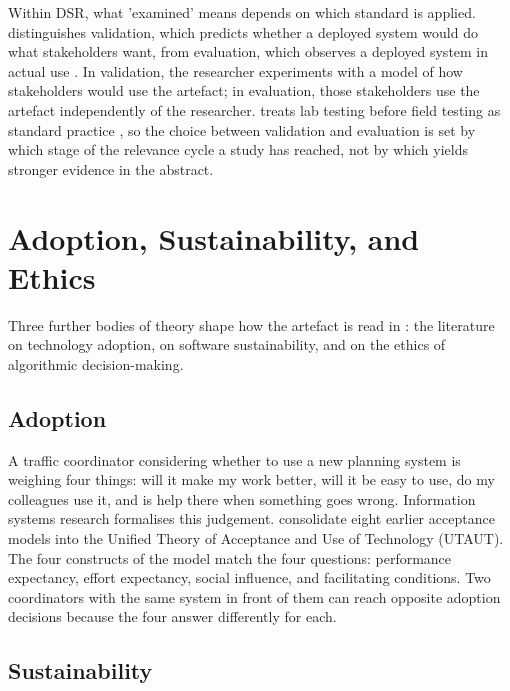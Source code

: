 Within DSR, what 'examined' means depends on which standard is applied. \textcite{wieringa2014dsm} distinguishes validation, which predicts whether a deployed system would do what stakeholders want, from evaluation, which observes a deployed system in actual use \parencite[pp.~31, 34]{wieringa2014dsm}. In validation, the researcher experiments with a model of how stakeholders would use the artefact; in evaluation, those stakeholders use the artefact independently of the researcher. \textcite{hevner2007threecycle} treats lab testing before field testing as standard practice \parencite[p.~91]{hevner2007threecycle}, so the choice between validation and evaluation is set by which stage of the relevance cycle a study has reached, not by which yields stronger evidence in the abstract.


\section{Adoption, Sustainability, and Ethics}
\label{sec:adjacent}

Three further bodies of theory shape how the artefact is read in : the literature on technology adoption, on software sustainability, and on the ethics of algorithmic decision-making.

\subsection{Adoption}
\label{sec:utaut}

A traffic coordinator considering whether to use a new planning system is weighing four things: will it make my work better, will it be easy to use, do my colleagues use it, and is help there when something goes wrong. Information systems research formalises this judgement. \textcite{venkatesh2003utaut} consolidate eight earlier acceptance models into the Unified Theory of Acceptance and Use of Technology (UTAUT). The four constructs of the model match the four questions: performance expectancy, effort expectancy, social influence, and facilitating conditions. Two coordinators with the same system in front of them can reach opposite adoption decisions because the four answer differently for each.

\subsection{Sustainability}
\label{sec:susaf}

